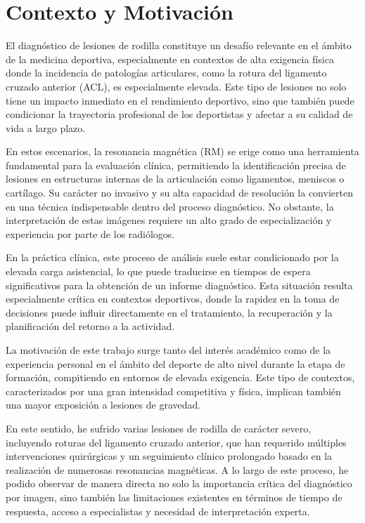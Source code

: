 

\section{Contexto y Motivación}

El diagnóstico de lesiones de rodilla constituye un desafío relevante en el ámbito de la medicina deportiva, especialmente en contextos de alta exigencia física donde la incidencia de patologías articulares, como la rotura del ligamento cruzado anterior (ACL), es especialmente elevada. Este tipo de lesiones no solo tiene un impacto inmediato en el rendimiento deportivo, sino que también puede condicionar la trayectoria profesional de los deportistas y afectar a su calidad de vida a largo plazo.

En estos escenarios, la resonancia magnética (RM) se erige como una herramienta fundamental para la evaluación clínica, permitiendo la identificación precisa de lesiones en estructuras internas de la articulación como ligamentos, meniscos o cartílago. Su carácter no invasivo y su alta capacidad de resolución la convierten en una técnica indispensable dentro del proceso diagnóstico. No obstante, la interpretación de estas imágenes requiere un alto grado de especialización y experiencia por parte de los radiólogos.

En la práctica clínica, este proceso de análisis suele estar condicionado por la elevada carga asistencial, lo que puede traducirse en tiempos de espera significativos para la obtención de un informe diagnóstico. Esta situación resulta especialmente crítica en contextos deportivos, donde la rapidez en la toma de decisiones puede influir directamente en el tratamiento, la recuperación y la planificación del retorno a la actividad.

La motivación de este trabajo surge tanto del interés académico como de la experiencia personal en el ámbito del deporte de alto nivel durante la etapa de formación, compitiendo en entornos de elevada exigencia. Este tipo de contextos, caracterizados por una gran intensidad competitiva y física, implican también una mayor exposición a lesiones de gravedad.

En este sentido, he sufrido varias lesiones de rodilla de carácter severo, incluyendo roturas del ligamento cruzado anterior, que han requerido múltiples intervenciones quirúrgicas y un seguimiento clínico prolongado basado en la realización de numerosas resonancias magnéticas. A lo largo de este proceso, he podido observar de manera directa no solo la importancia crítica del diagnóstico por imagen, sino también las limitaciones existentes en términos de tiempo de respuesta, acceso a especialistas y necesidad de interpretación experta.

